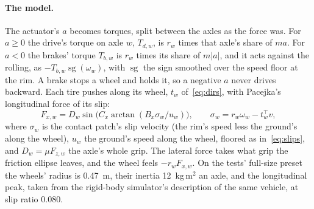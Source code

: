 \documentclass[11pt]{article}
\theoremstyle{remark}
\newcommand{\T}{^{\top}}
\begin{document}
\paragraph{The model.} The actuator's $a$ becomes torques, split between the axles as the force
was. For $a\ge0$ the drive's torque on axle $w$, $T_{d,w}$, is $r_w$ times that axle's share of
$ma$. For $a<0$ the brakes' torque $T_{b,w}$ is $r_w$ times its share of $m\lvert a\rvert$, and it
acts against the rolling, as $-T_{b,w}\operatorname{sg}(\omega_w)$, with $\operatorname{sg}$ the
sign smoothed over the speed floor at the rim. A brake stops a wheel and holds it, so a negative
$a$ never drives backward. Each tire pushes along its wheel, $t_w$ of~\eqref{eq:dirs}, with
Pacejka's longitudinal force of its slip:
\begin{equation}
  F_{x,w}=D_w\sin\!\big(C_x\arctan(B_x\sigma_w/u_w)\big),\qquad \sigma_w=r_w\omega_w-t_w\T v,
  \label{eq:spin-tire}
\end{equation}
where $\sigma_w$ is the contact patch's slip velocity (the rim's speed less the ground's along the
wheel), $u_w$ the ground's speed along the wheel, floored as in~\eqref{eq:slips}, and
$D_w=\mu F_{z,w}$ the axle's whole grip. The lateral force takes what grip the friction ellipse
leaves, and the wheel feels $-r_wF_{x,w}$. On the tests' full-size preset the wheels' radius is
0.47~m, their inertia 12~kg\,m$^2$ an axle, and the longitudinal peak, taken from the rigid-body
simulator's description of the same vehicle, at slip ratio 0.080.
\end{document}
